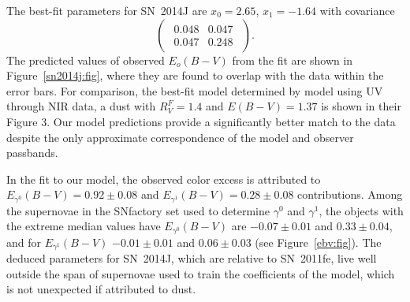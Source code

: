 \documentclass{aastex61}   	%
\begin{document}
The best-fit parameters for SN~2014J are 
$x_0= 2.65$, $ x_1=-1.64$ with covariance
\begin{equation}
\begin{pmatrix}
\begin{array}{rr}
0.048 & 0.047 \\
0.047 & 0.248
\end{array}
\end{pmatrix}.
\end{equation}
The predicted values of observed $E_o(B-V)$ from the fit are shown in Figure~\ref{sn2014j:fig}, where they are found to
overlap with the data within the error bars.   For comparison, the best-fit model determined by  \citet{2014ApJ...788L..21A} model using
UV through NIR data,
a  \citet{1999PASP..111...63F} dust with $R_V^F=1.4$ and $E(B-V)=1.37$
\color{red}
is shown in their Figure 3.
\color{black}
Our model predictions provide a significantly better match to the data
\color{red}
despite the only approximate correspondence of the model and observer passbands.
\color{black}

In the fit to our model, the observed color excess is attributed to 
$E_{\gamma^0}(B-V)=  0.92 \pm   0.08$ and  $E_{\gamma^1}(B-V)=  0.28 \pm   0.08$
contributions.
Among the supernovae in the SNfactory  set used to determine $\gamma^0$ and $\gamma^1$, the
objects with the extreme median values have 
$E_{\gamma^0}(B-V)$ are $-0.07 \pm 0.01$ and  $  0.33 \pm 0.04$,
and for $E_{\gamma^1}(B-V)$ $-0.01 \pm 0.01$  and
$  0.06 \pm 0.03$ 
(see Figure~\ref{ebv:fig}).
The deduced parameters for SN~2014J, which are relative to SN~2011fe, live well outside the 
span of supernovae used to train the coefficients of the model, which is not unexpected if
attributed to dust. 
\end{document}
